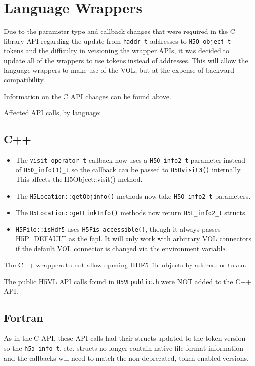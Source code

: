 \section{Language Wrappers}

Due to the parameter type and callback changes that were required in the C
library API regarding the update from {\tt haddr\_t} addresses to
{\tt H5O\_object\_t} tokens and the difficulty in versioning the wrapper
APIs, it was decided to update all of the wrappers to use tokens instead
of addresses. This will allow the language wrappers to make use of the VOL,
but at the expense of backward compatibility.

Information on the C API changes can be found above.

Affected API calls, by language:

\subsection{C++}

\begin{itemize}
    \item The {\tt visit\_operator\_t} callback now uses a {\tt H5O\_info2\_t} parameter instead of {\tt H5O\_info(1)\_t} so the callback can be passed to {\tt H5Ovisit3()} internally. This affects the H5Object::visit() method.
    \item The {\tt H5Location::getObjinfo()} methods now take {\tt H5O\_info2\_t} parameters.
    \item The {\tt H5Location::getLinkInfo()} methods now return {\tt H5L\_info2\_t} structs.
    \item {\tt H5File::isHdf5} uses {\tt H5Fis\_accessible()}, though it always passes H5P\_DEFAULT as the fapl. It will only work with arbitrary VOL connectors if the default VOL connector is changed via the environment variable.
\end{itemize}

The C++ wrappers to not allow opening HDF5 file objects by address or token.

The public H5VL API calls found in {\tt H5VLpublic.h} were NOT added to
the C++ API.

\subsection{Fortran}

As in the C API, these API calls had their structs updated to the token version so
the {\tt h5o\_info\_t}, etc. structs no longer contain native file format information
and the callbacks will need to match the non-deprecated, token-enabled versions.

